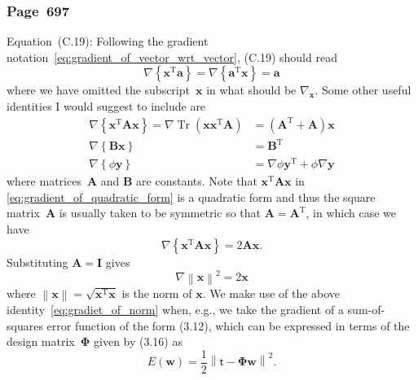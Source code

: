 \documentclass[12pt,a4paper]{article}
\newcommand{\erratum}[1]{%
\subsubsection*{#1}
\addcontentsline{toc}{subsection}{#1}}
\begin{document}
\erratum{Page~697}
Equation~(C.19):
Following the gradient notation~\eqref{eq:gradient_of_vector_wrt_vector}, (C.19) should read
\begin{equation}
\nabla \left\{ \mathbf{x}^{\operatorname{T}} \mathbf{a} \right\} =
\nabla \left\{ \mathbf{a}^{\operatorname{T}} \mathbf{x} \right\} =
\mathbf{a}
\end{equation}
where we have omitted the subscript~$\mathbf{x}$ in what should be $\nabla_{\mathbf{x}}$.
Some other useful identities I would suggest to include are
\begin{align}
\nabla \left\{ \mathbf{x}^{\operatorname{T}} \mathbf{A} \mathbf{x} \right\} =
\nabla \operatorname{Tr}\left(\mathbf{x}\mathbf{x}^{\operatorname{T}}\mathbf{A}\right) &=
\left( \mathbf{A}^{\operatorname{T}} + \mathbf{A} \right)\mathbf{x}
\label{eq:gradient_of_quadratic_form} \\
\nabla \left\{ \mathbf{B}\mathbf{x} \right\} & = \mathbf{B}^{\operatorname{T}}
\label{eq:gradient_of_matrix_vector_product} \\
\nabla \left\{ \phi\mathbf{y} \right\} &=
\nabla\phi \mathbf{y}^{\operatorname{T}} + \phi \nabla\mathbf{y}
\label{eq:gradient_of_scalar_vector_product}
\end{align}
where matrices~$\mathbf{A}$ and $\mathbf{B}$ are constants.
Note that $\mathbf{x}^{\operatorname{T}} \mathbf{A} \mathbf{x}$ in
\eqref{eq:gradient_of_quadratic_form} is a quadratic form and thus
the square matrix~$\mathbf{A}$ is usually taken to be symmetric so that
$\mathbf{A} = \mathbf{A}^{\operatorname{T}}$, in which case we have
\begin{equation}
\nabla \left\{ \mathbf{x}^{\operatorname{T}} \mathbf{A} \mathbf{x} \right\} =
2\mathbf{A} \mathbf{x} \label{eq:gradient_of_quadratic_form_symmetric} .
\end{equation}
Substituting $\mathbf{A} = \mathbf{I}$ gives
\begin{equation}
\nabla \left\| \mathbf{x} \right\|^{2} = 2\mathbf{x} \label{eq:gradiet_of_norm}
\end{equation}
where $\left\| \mathbf{x} \right\| = \sqrt{\mathbf{x}^{\operatorname{T}}\mathbf{x}}$ is
the norm of $\mathbf{x}$.
We make use of the above identity~\eqref{eq:gradiet_of_norm} when, e.g., we take the gradient of
a sum-of-squares error function of the form (3.12),
which can be expressed in terms of the design matrix~$\bm{\Phi}$ given by (3.16) as
\begin{equation}
E(\mathbf{w}) = \frac{1}{2} \left\| \bm{\mathsf{t}} - \bm{\Phi}\mathbf{w} \right\|^2
\label{eq:sum_of_squares_error} .
\end{equation}
\end{document}
